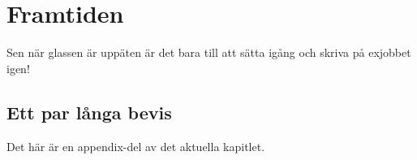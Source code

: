 \section{Framtiden}

Sen när glassen är uppäten är det bara till att sätta igång och skriva på exjobbet igen!


\begin{chapter-appendix}

\section{Ett par långa bevis}
%
Det här är en appendix-del av det aktuella kapitlet.

\end{chapter-appendix}
